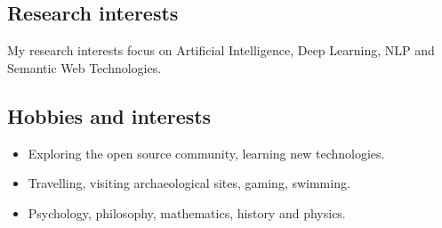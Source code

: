 \documentclass[a4paper,oneside,10pt]{article}
\begin{document}
\subsection*{Research interests}

My research interests focus on Artificial Intelligence, Deep Learning, NLP and Semantic Web Technologies.

\subsection*{Hobbies and interests}

\begin{itemize}

	\item Exploring the open source community, learning new technologies.

	\item Travelling, visiting archaeological sites, gaming, swimming.
	
	\item Psychology, philosophy, mathematics, history and physics.

\end{itemize}
\end{document}
